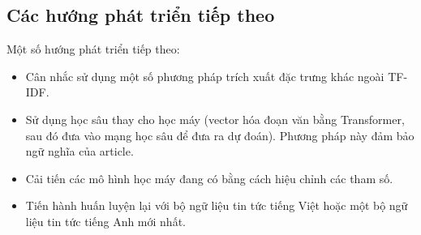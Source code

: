 \documentclass[12pt]{article}
\begin{document}
\subsection{Các hướng phát triển tiếp theo}
Một số hướng phát triển tiếp theo:
\begin{itemize}
\item Cân nhắc sử dụng một số phương pháp trích xuất đặc trưng khác ngoài TF-IDF.
\item Sử dụng học sâu thay cho học máy (vector hóa đoạn văn bằng Transformer, sau đó đưa vào mạng học sâu để đưa ra dự đoán). Phương pháp này đảm bảo ngữ nghĩa của article.
\item Cải tiến các mô hình học máy đang có bằng cách hiệu chỉnh các tham số.
\item Tiến hành huấn luyện lại với bộ ngữ liệu tin tức tiếng Việt hoặc một bộ ngữ liệu tin tức tiếng Anh mới nhất.
\end{itemize}



\end{document}
